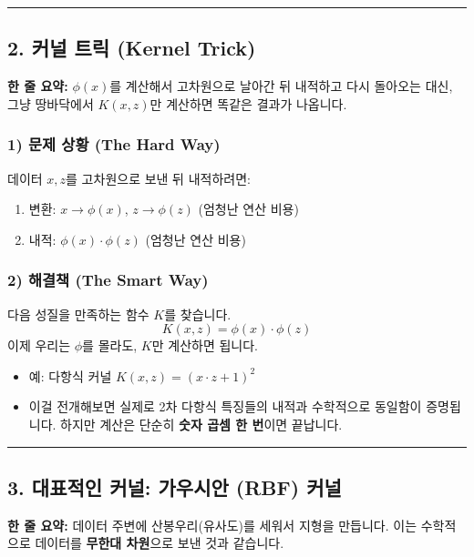 \documentclass[11pt,a4paper]{book}
\theoremstyle{definition}
\begin{document}
\vspace{0.5cm}\hrule\vspace{0.5cm}

\subsection{2. 커널 트릭 (Kernel Trick)}

\begin{conceptbox}[title={개념 2: 웜홀(Wormhole) 타기}]
\textbf{한 줄 요약:} $\phi(x)$를 계산해서 고차원으로 날아간 뒤 내적하고 다시 돌아오는 대신, 그냥 땅바닥에서 $K(x, z)$만 계산하면 똑같은 결과가 나옵니다.
\end{conceptbox}


\subsubsection*{1) 문제 상황 (The Hard Way)}
데이터 $x, z$를 고차원으로 보낸 뒤 내적하려면:
\begin{enumerate}
    \item 변환: $x \to \phi(x)$, $z \to \phi(z)$ (엄청난 연산 비용)
    \item 내적: $\phi(x) \cdot \phi(z)$ (엄청난 연산 비용)
\end{enumerate}

\subsubsection*{2) 해결책 (The Smart Way)}
다음 성질을 만족하는 함수 $K$를 찾습니다.
$$ K(x, z) = \phi(x) \cdot \phi(z) $$
이제 우리는 $\phi$를 몰라도, $K$만 계산하면 됩니다.
\begin{itemize}
    \item 예: 다항식 커널 $K(x, z) = (x \cdot z + 1)^2$
    \item 이걸 전개해보면 실제로 2차 다항식 특징들의 내적과 수학적으로 동일함이 증명됩니다. 하지만 계산은 단순히 \textbf{숫자 곱셈 한 번}이면 끝납니다.
\end{itemize}

\vspace{0.5cm}\hrule\vspace{0.5cm}

\subsection{3. 대표적인 커널: 가우시안 (RBF) 커널}

\begin{conceptbox}[title={개념 3: 무한 차원의 마법}]
\textbf{한 줄 요약:} 데이터 주변에 산봉우리(유사도)를 세워서 지형을 만듭니다. 이는 수학적으로 데이터를 \textbf{무한대 차원}으로 보낸 것과 같습니다.
\end{conceptbox}
\end{document}
